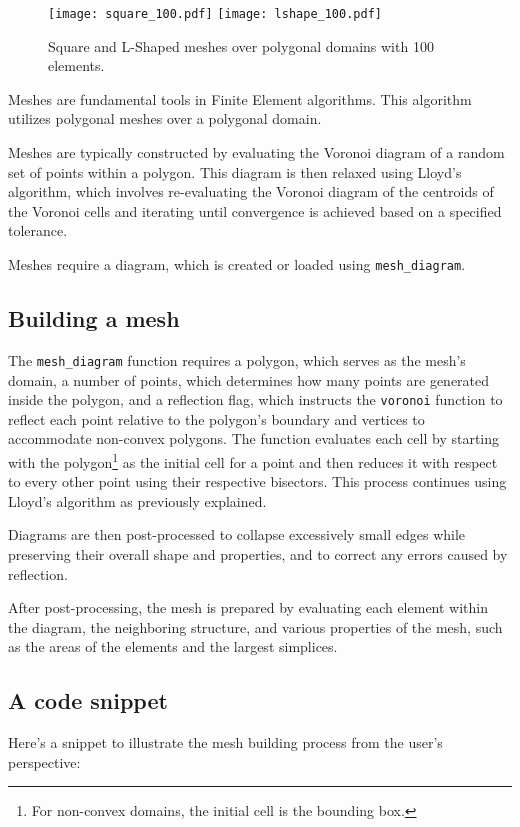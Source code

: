 \begin{figure}[!ht]
	\centering
	\texttt{[image: square\_100.pdf]}
    \texttt{[image: lshape\_100.pdf]}
	\caption{Square and L-Shaped meshes over polygonal domains with 100 elements.}
\end{figure}

Meshes are fundamental tools in Finite Element algorithms. This algorithm utilizes polygonal meshes over a polygonal domain.

\cite{Talischi2012} Meshes are typically constructed by evaluating the Voronoi diagram of a random set of points within a polygon. This diagram is then relaxed using Lloyd's algorithm, which involves re-evaluating the Voronoi diagram of the centroids of the Voronoi cells and iterating until convergence is achieved based on a specified tolerance.

Meshes require a diagram, which is created or loaded using \lstinline{mesh_diagram}.

\subsection{Building a mesh}

The \lstinline{mesh_diagram} function requires a polygon, which serves as the mesh's domain, a number of points, which determines how many points are generated inside the polygon, and a reflection flag, which instructs the \lstinline{voronoi} function to reflect each point relative to the polygon's boundary and vertices to accommodate non-convex polygons. The function evaluates each cell by starting with the polygon\footnote{For non-convex domains, the initial cell is the bounding box.} as the initial cell for a point and then reduces it with respect to every other point using their respective bisectors. This process continues using Lloyd's algorithm as previously explained.

Diagrams are then post-processed to collapse excessively small edges while preserving their overall shape and properties, and to correct any errors caused by reflection.

After post-processing, the mesh is prepared by evaluating each element within the diagram, the neighboring structure, and various properties of the mesh, such as the areas of the elements and the largest simplices.

\newpage
\subsection{A code snippet}

Here's a snippet to illustrate the mesh building process from the user's perspective:


